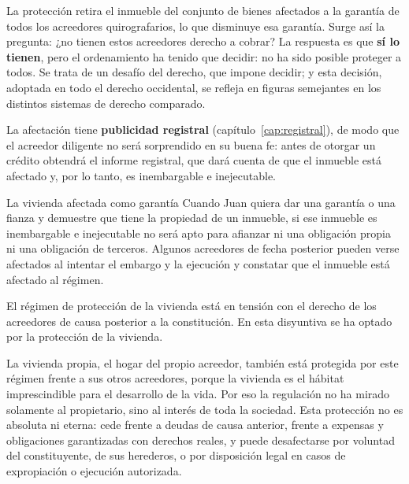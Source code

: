 \documentclass[12pt,oneside]{book}
\begin{document}
La protección retira el inmueble del conjunto de bienes afectados a la garantía de todos los acreedores quirografarios, lo que disminuye esa garantía. Surge así la pregunta: ¿no tienen estos acreedores derecho a cobrar? La respuesta es que \textbf{sí lo tienen}, pero el ordenamiento ha tenido que decidir: no ha sido posible proteger a todos. Se trata de un desafío del derecho, que impone decidir; y esta decisión, adoptada en todo el derecho occidental, se refleja en figuras semejantes en los distintos sistemas de derecho comparado.

La afectación tiene \textbf{publicidad registral} (capítulo~\ref{cap:registral}), de modo que el acreedor diligente no será sorprendido en su buena fe: antes de otorgar un crédito obtendrá el informe registral, que dará cuenta de que el inmueble está afectado y, por lo tanto, es inembargable e inejecutable.

\begin{example}{La vivienda afectada como garantía}
Cuando Juan quiera dar una garantía o una fianza y demuestre que tiene la propiedad de un inmueble, si ese inmueble es inembargable e inejecutable no será apto para afianzar ni una obligación propia ni una obligación de terceros. Algunos acreedores de fecha posterior pueden verse afectados al intentar el embargo y la ejecución y constatar que el inmueble está afectado al régimen.
\end{example}

\begin{important}
El régimen de protección de la vivienda está en tensión con el derecho de los acreedores de causa posterior a la constitución. En esta disyuntiva se ha optado por la protección de la vivienda.
\end{important}

La vivienda propia, el hogar del propio acreedor, también está protegida por este régimen frente a sus otros acreedores, porque la vivienda es el hábitat imprescindible para el desarrollo de la vida. Por eso la regulación no ha mirado solamente al propietario, sino al interés de toda la sociedad. Esta protección no es absoluta ni eterna: cede frente a deudas de causa anterior, frente a expensas y obligaciones garantizadas con derechos reales, y puede desafectarse por voluntad del constituyente, de sus herederos, o por disposición legal en casos de expropiación o ejecución autorizada.
\end{document}
